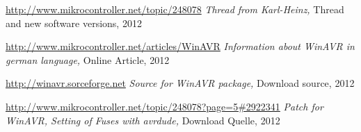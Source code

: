 \documentclass[12pt,a4paper,oneside,english]{report}
\begin{document}
\begin{thebibliography}{99}
\url{http://www.mikrocontroller.net/topic/248078}
\emph{Thread from Karl-Heinz,}
Thread and new software versions,
2012

\url{http://www.mikrocontroller.net/articles/WinAVR}
\emph{Information about WinAVR in german language,}
Online Article,
2012

\url{http://winavr.sorceforge.net}
\emph{Source for WinAVR package,}
Download source,
2012

\url{http://www.mikrocontroller.net/topic/248078?page=5#2922341}
\emph{Patch for WinAVR, Setting of Fuses with avrdude,}
Download Quelle,
2012




\end{thebibliography}
\end{document}
